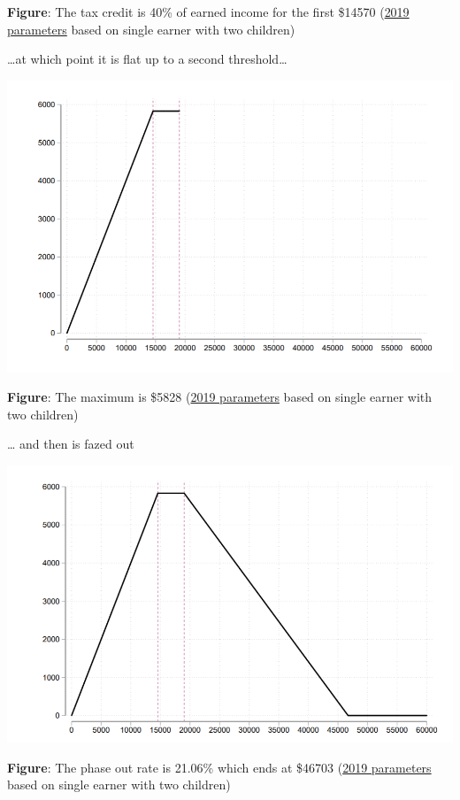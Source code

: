 \documentclass[
  letterpaper,
  DIV=11,
  numbers=noendperiod]{scrreprt}
\theoremstyle{definition}
\theoremstyle{remark}
\begin{document}
\begin{enumerate}
  \textbf{Figure}: The tax credit is 40\% of earned income for the first
  \$14570
  (\href{https://www.cbpp.org/research/policy-basics-the-earned-income-tax-credit}{2019
  parameters} based on single earner with two children)

  \ldots at which point it is flat up to a second threshold\ldots{}

  \includegraphics{docs/images/EL2.png}

  \textbf{Figure}: The maximum is \$5828
  (\href{https://www.cbpp.org/research/policy-basics-the-earned-income-tax-credit}{2019
  parameters} based on single earner with two children)

  \ldots{} and then is fazed out
\end{enumerate}

\includegraphics{docs/images/EL3.png}

\textbf{Figure}: The phase out rate is 21.06\% which ends at \$46703
(\href{https://www.cbpp.org/research/policy-basics-the-earned-income-tax-credit}{2019
parameters} based on single earner with two children)
\end{document}
